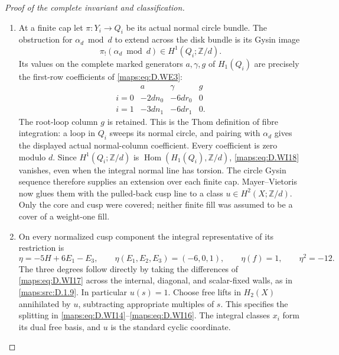 \begin{proof}[Proof of the complete invariant and classification]
\begin{enumerate}[label=\arabic*.,leftmargin=*]
\item At a finite cap let $\pi:Y_i\longrightarrow Q_i$ be its
actual normal circle bundle. The obstruction for
$\alpha_d\bmod d$ to extend across the disk bundle is its
Gysin image
\[
                  \pi_!(\alpha_d\bmod d)\in
                         H^1(Q_i;\mathbb Z/d).
 \tag{D.WI18}\label{maps:eq:D.WI18}
\]
Its values on the complete marked generators
$a,\gamma,g$ of $H_1(Q_i)$ are precisely the first-row
coefficients of \eqref{maps:eq:D.WE3}:
\[
 \begin{array}{c|ccc}
       &a&\gamma&g\\ \hline
 i=0&-2dn_0&-6dr_0&0\\
 i=1&-3dn_1&-6dr_1&0.
 \end{array}
 \tag{D.WI19}\label{maps:eq:D.WI19}
\]
The root-loop column $g$ is retained. This is the Thom
definition of fibre integration: a loop in $Q_i$ sweeps its
normal circle, and pairing with $\alpha_d$ gives the displayed
actual normal-column coefficient. Every coefficient is zero
modulo $d$. Since $H^1(Q_i;\mathbb Z/d)$ is
$\operatorname{Hom}(H_1(Q_i),\mathbb Z/d)$, \eqref{maps:eq:D.WI18} vanishes,
even when the integral normal line has torsion. The circle
Gysin sequence therefore supplies an extension over each
finite cap. Mayer--Vietoris now glues them with the pulled-back
cusp line to a class $u\in H^2(X;\mathbb Z/d)$.
Only the core and cusp were covered; neither finite fill was
assumed to be a cover of a weight-one fill.

\item On every normalized cusp component the integral representative
of its restriction is
\[
              \eta=-5H+6E_1-E_3,\qquad
       \eta(E_1,E_2,E_3)=(-6,0,1),\qquad
       \eta(f)=1,\qquad \eta^2=-12.
 \tag{D.WI20}\label{maps:eq:D.WI20}
\]
The three degrees follow directly by taking the differences
of \eqref{maps:eq:D.WI17} across the internal, diagonal, and scalar-fixed
walls, as in \ref{maps:src:D.1.9}. In particular $u(s)=1$.
Choose free lifts in $H_2(X)$ annihilated by $u$, subtracting
appropriate multiples of $s$. This specifies the splitting
in \eqref{maps:eq:D.WI14}--\eqref{maps:eq:D.WI16}. The integral classes $x_i$ form its
dual free basis, and $u$ is the standard cyclic coordinate.


\end{enumerate}
\end{proof}
